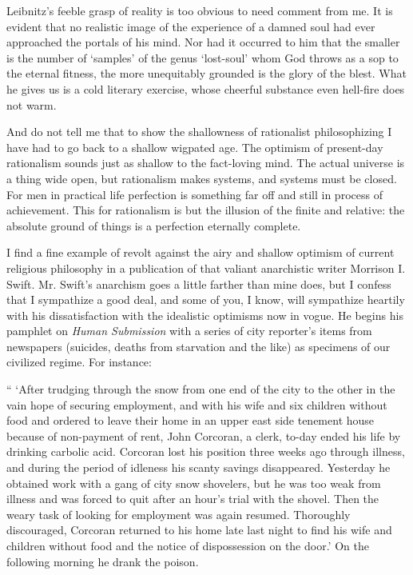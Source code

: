 \documentclass[]{article}
\begin{document}
Leibnitz's feeble grasp of reality is too obvious to need comment from
me. It is evident that no realistic image of the experience of a damned
soul had ever approached the portals of his mind. Nor had it occurred to
him that the smaller is the number of `samples' of the genus `lost-soul'
whom God throws as a sop to the eternal fitness, the more unequitably
grounded is the glory of the blest. What he gives us is a cold literary
exercise, whose cheerful substance even hell-fire does not warm.

And do not tell me that to show the shallowness of rationalist
philosophizing I have had to go back to a shallow wigpated age. The
optimism of present-day rationalism sounds just as shallow to the
fact-loving mind. The actual universe is a thing wide open, but
rationalism makes systems, and systems must be closed. For men in
practical life perfection is something far off and still in process of
achievement. This for rationalism is but the illusion of the finite
and relative: the absolute ground of things is a perfection eternally
complete.

I find a fine example of revolt against the airy and shallow optimism
of current religious philosophy in a publication of that valiant
anarchistic writer Morrison I. Swift. Mr. Swift's anarchism goes a
little farther than mine does, but I confess that I sympathize a
good deal, and some of you, I know, will sympathize heartily with his
dissatisfaction with the idealistic optimisms now in vogue. He begins
his pamphlet on \emph{Human Submission} with a series of city reporter's
items from newspapers (suicides, deaths from starvation and the like) as
specimens of our civilized regime. For instance:

`` `After trudging through the snow from one end of the city to the other
in the vain hope of securing employment, and with his wife and six
children without food and ordered to leave their home in an upper east
side tenement house because of non-payment of rent, John Corcoran, a
clerk, to-day ended his life by drinking carbolic acid. Corcoran lost
his position three weeks ago through illness, and during the period of
idleness his scanty savings disappeared. Yesterday he obtained work with
a gang of city snow shovelers, but he was too weak from illness and was
forced to quit after an hour's trial with the shovel. Then the
weary task of looking for employment was again resumed. Thoroughly
discouraged, Corcoran returned to his home late last night to find his
wife and children without food and the notice of dispossession on the
door.' On the following morning he drank the poison.
\end{document}
